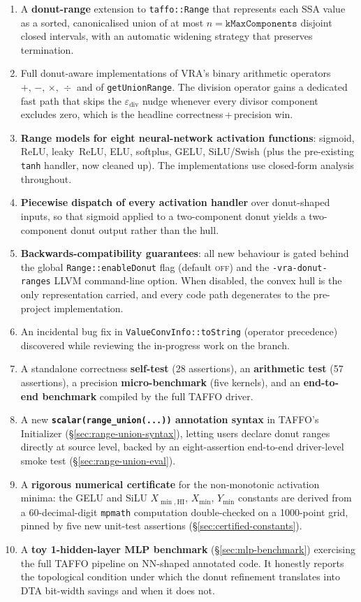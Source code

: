 \documentclass[11pt,a4paper]{article}
\theoremstyle{plain}
\begin{document}
\begin{enumerate}
\item A \textbf{donut-range} extension to \texttt{taffo::Range} that
  represents each SSA value as a sorted, canonicalised union of at most
  $n=\texttt{kMaxComponents}$ disjoint closed intervals, with an
  automatic widening strategy that preserves termination.
\item Full donut-aware implementations of VRA's binary arithmetic
  operators $+,\,-,\,\times,\,\div$ and of \texttt{getUnionRange}. The
  division operator gains a dedicated fast path that skips the
  $\varepsilon_{\text{div}}$ nudge whenever every divisor component
  excludes zero, which is the headline correctness\,+\,precision win.
\item \textbf{Range models for eight neural-network activation
  functions}: sigmoid, ReLU, leaky~ReLU, ELU, softplus, GELU,
  SiLU/Swish (plus the pre-existing \texttt{tanh} handler, now cleaned
  up). The implementations use closed-form analysis throughout.
\item \textbf{Piecewise dispatch of every activation handler} over
  donut-shaped inputs, so that sigmoid applied to a two-component donut
  yields a two-component donut output rather than the hull.
\item \textbf{Backwards-compatibility guarantees}: all new behaviour is
  gated behind the global \texttt{Range::enableDonut} flag (default
  \textsc{off}) and the \texttt{-vra-donut-ranges} LLVM command-line
  option. When disabled, the convex hull is the only representation
  carried, and every code path degenerates to the pre-project
  implementation.
\item An incidental bug fix in
  \texttt{ValueConvInfo::toString} (operator precedence) discovered
  while reviewing the in-progress work on the branch.
\item A standalone correctness \textbf{self-test} (28 assertions), an
  \textbf{arithmetic test} (57 assertions), a precision
  \textbf{micro-benchmark} (five kernels), and an
  \textbf{end-to-end benchmark} compiled by the full TAFFO driver.
\item A new \textbf{\texttt{scalar(range\_union(...))} annotation
  syntax} in TAFFO's Initializer (\S\ref{sec:range-union-syntax}),
  letting users declare donut ranges directly at source level, backed
  by an eight-assertion end-to-end driver-level smoke test
  (\S\ref{sec:range-union-eval}).
\item A \textbf{rigorous numerical certificate} for the non-monotonic
  activation minima: the GELU and SiLU $X_{\min,\mathrm{HI}}$,
  $X_{\min}$, $Y_{\min}$ constants are derived from a 60-decimal-digit
  \texttt{mpmath} computation double-checked on a 1000-point grid,
  pinned by five new unit-test assertions (\S\ref{sec:certified-constants}).
\item A \textbf{toy 1-hidden-layer MLP benchmark}
  (\S\ref{sec:mlp-benchmark}) exercising the full TAFFO pipeline on
  NN-shaped annotated code. It honestly reports the topological
  condition under which the donut refinement translates into DTA
  bit-width savings and when it does not.
\end{enumerate}
\end{document}
